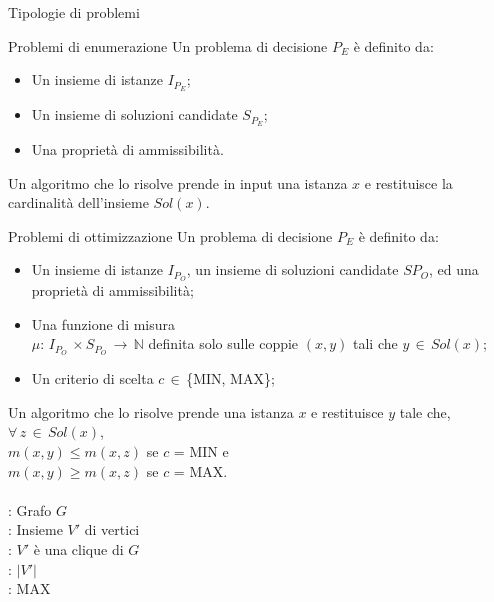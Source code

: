 \documentclass[10pt,a4paper]{article}
\begin{document}
\begin{multicols}{3}
\begin{textbox}{Tipologie di problemi}
\begin{textbox}{Problemi di enumerazione}
Un problema di decisione \(P_E\) è definito da:
\begin{itemize}[leftmargin=*]
    \item Un insieme di istanze \(I_{P_E}\);
    \item Un insieme di soluzioni candidate  \(S_{P_E}\);
    \item Una proprietà di ammissibilità.
\end{itemize}
Un algoritmo che lo risolve prende in input una istanza \(x\)  e
restituisce la cardinalità dell’insieme \(Sol(x)\).
\end{textbox}

\begin{textbox}{Problemi di ottimizzazione}
Un problema di decisione \(P_E\) è definito da:
\begin{itemize}[leftmargin=*]
    \item Un insieme di istanze \(I_{P_O}\), un insieme di soluzioni candidate  \(S{P_O}\), ed una proprietà di ammissibilità;
    \item Una funzione di misura \\\(\mu:\,I_{P_O}\,\times S_{P_O}\,\rightarrow\,\mathbb{N} \)
    definita solo sulle coppie \((x,y)\) tali che \(y\,\in\,Sol(x)\);
    \item Un criterio di scelta \(c\,\in\,\)\{MIN, MAX\};
\end{itemize}
Un algoritmo che lo risolve prende
una istanza \(x\) e restituisce \(y\) tale
che,\\ \(\forall\,z\,\in\,Sol(x)\), \\
\(m(x,y) \leq m(x,z)\) se \(c\) = MIN e \\
\(m(x,y) \geq m(x,z)\) se \(c\) = MAX.\\
\\
: Grafo \(G\)\\
: Insieme \(V'\) di vertici \\
: \(V'\) è una clique di \(G\)\\
: \(|V'|\) \\
: MAX
\end{textbox}


\end{textbox}




\end{multicols}
\end{document}
